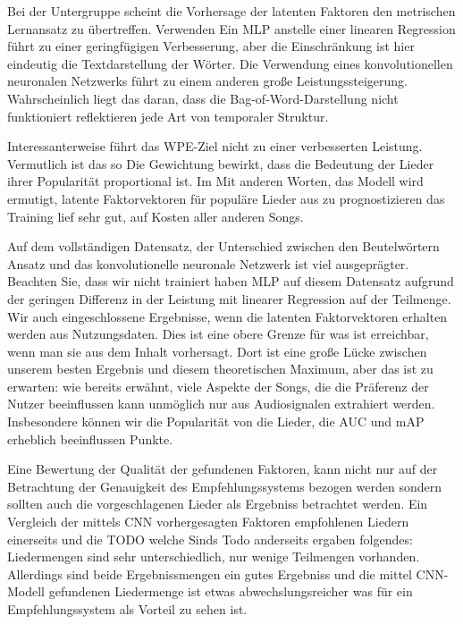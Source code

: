\documentclass[twosided,a4,10pt]{article}
\begin{document}
\begin{multicols}{2}
		
		Bei der Untergruppe scheint die Vorhersage der latenten Faktoren den metrischen Lernansatz zu übertreffen. Verwenden Ein MLP anstelle einer linearen Regression führt zu einer geringfügigen Verbesserung, aber die Einschränkung ist hier eindeutig die Textdarstellung der Wörter. Die Verwendung eines konvolutionellen neuronalen Netzwerks führt zu einem anderen große Leistungssteigerung. Wahrscheinlich liegt das daran, dass die Bag-of-Word-Darstellung nicht funktioniert reflektieren jede Art von temporaler Struktur.
		
		Interessanterweise führt das WPE-Ziel nicht zu einer verbesserten Leistung. Vermutlich ist das so Die Gewichtung bewirkt, dass die Bedeutung der Lieder ihrer Popularität proportional ist. Im Mit anderen Worten, das Modell wird ermutigt, latente Faktorvektoren für populäre Lieder aus zu prognostizieren das Training lief sehr gut, auf Kosten aller anderen Songs.
		
		Auf dem vollständigen Datensatz, der Unterschied zwischen den Beutelwörtern Ansatz und das konvolutionelle neuronale Netzwerk ist viel ausgeprägter. Beachten Sie, dass wir nicht trainiert haben MLP auf diesem Datensatz aufgrund der geringen Differenz in der Leistung mit linearer Regression auf der Teilmenge. Wir auch eingeschlossene Ergebnisse, wenn die latenten Faktorvektoren erhalten werden aus Nutzungsdaten. Dies ist eine obere Grenze für was ist erreichbar, wenn man sie aus dem Inhalt vorhersagt. Dort ist eine große Lücke zwischen unserem besten Ergebnis und diesem theoretischen Maximum, aber das ist zu erwarten: wie bereits erwähnt, viele Aspekte der Songs, die die Präferenz der Nutzer beeinflussen kann unmöglich nur aus Audiosignalen extrahiert werden. Insbesondere können wir die Popularität von die Lieder, die AUC und mAP erheblich beeinflussen Punkte.
		
		
		
		Eine Bewertung der Qualität der gefundenen Faktoren, kann nicht nur auf der Betrachtung der Genauigkeit des Empfehlungssystems bezogen werden sondern sollten auch die vorgeschlagenen Lieder als Ergebniss betrachtet werden. Ein Vergleich der mittels CNN vorhergesagten Faktoren empfohlenen Liedern einerseits und die TODO welche Sinds Todo anderseits ergaben folgendes: Liedermengen sind sehr unterschiedlich, nur wenige Teilmengen vorhanden. Allerdings sind beide Ergebnissmengen ein gutes Ergebniss und die mittel CNN-Modell gefundenen Liedermenge ist etwas abwechslungsreicher was für ein Empfehlungssystem als Vorteil zu sehen ist.
		

\end{multicols}
\end{document}

